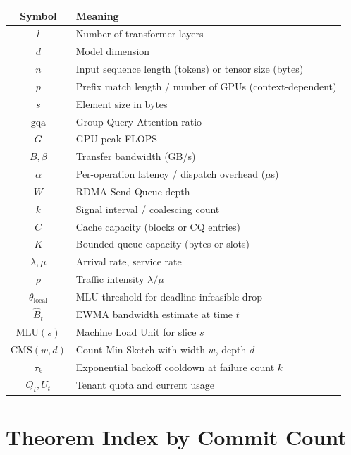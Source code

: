\documentclass[11pt,a4paper,twoside]{article}
\theoremstyle{plain}
\theoremstyle{definition}
\theoremstyle{remark}
\begin{document}
\begin{center}
\begin{tabular}{cl}
\toprule
\textbf{Symbol} & \textbf{Meaning} \\
\midrule
$l$ & Number of transformer layers \\
$d$ & Model dimension \\
$n$ & Input sequence length (tokens) or tensor size (bytes) \\
$p$ & Prefix match length / number of GPUs (context-dependent) \\
$s$ & Element size in bytes \\
$\text{gqa}$ & Group Query Attention ratio \\
$G$ & GPU peak FLOPS \\
$B, \beta$ & Transfer bandwidth (GB/s) \\
$\alpha$ & Per-operation latency / dispatch overhead ($\mu$s) \\
$W$ & RDMA Send Queue depth \\
$k$ & Signal interval / coalescing count \\
$C$ & Cache capacity (blocks or CQ entries) \\
$K$ & Bounded queue capacity (bytes or slots) \\
$\lambda, \mu$ & Arrival rate, service rate \\
$\rho$ & Traffic intensity $\lambda/\mu$ \\
$\theta_{\text{local}}$ & MLU threshold for deadline-infeasible drop \\
$\hat{B}_t$ & EWMA bandwidth estimate at time $t$ \\
$\text{MLU}(s)$ & Machine Load Unit for slice $s$ \\
$\text{CMS}(w,d)$ & Count-Min Sketch with width $w$, depth $d$ \\
$\tau_k$ & Exponential backoff cooldown at failure count $k$ \\
$Q_t, U_t$ & Tenant quota and current usage \\
\bottomrule
\end{tabular}
\end{center}


\section{Theorem Index by Commit Count}
\end{document}

